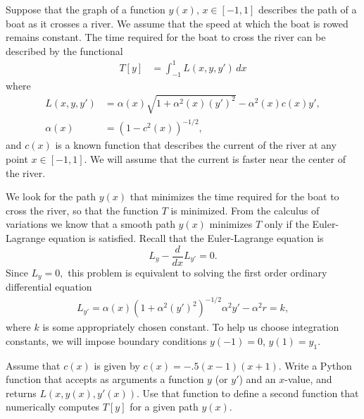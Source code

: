 \label{lab:rivercrossing}


Suppose that the graph of a function $y(x), \, x\in [-1,1]$ describes the path of a boat as it crosses a river. We assume that the speed at which the boat is rowed remains constant. The time required for the boat to cross the river can be described by the functional 
\begin{align*}
T[y] &=  \int_{-1}^1 L(x,y,y')\, dx
\end{align*}
where 
\begin{align*}
	L(x,y,y') &= \alpha(x) \sqrt{1 + \alpha^2(x)(y')^2} - \alpha^2(x)c(x)y', \\
	\alpha(x) &= (1-c^2(x))^{-1/2},
\end{align*}
and $c(x)$ is a known function that describes the current of the river at any point $x \in [-1,1]$. We will assume that the current is faster near the center of the river. 




We look for the path $y(x)$ that minimizes the time required for the boat to cross the river, so that the function $T$ is minimized. From the calculus of variations we know that a smooth path $y(x)$ minimizes $T$ only if the Euler-Lagrange equation is satisfied. Recall that the Euler-Lagrange equation is 
\[
L_{y} - \frac{d}{dx}L_{y'} = 0.
\]
Since $L_y = 0,$ this problem is equivalent to solving the first order ordinary differential equation
\begin{align*}
	L_{y'} = \alpha(x)(1 + \alpha^2 (y')^2)^{-1/2}\alpha^2 y' - \alpha^2 r =   k,
\end{align*}
where $k$ is some appropriately chosen constant. To help us choose integration constants, we will impose boundary conditions $y(-1) = 0$, $y(1) = y_1$. 



\begin{problem}
	Assume that $c(x)$ is given by $c(x) = -.5(x-1)(x+1)$.%
	Write a Python function that accepts as arguments a function $y$ (or $y'$) and an $x$-value, and returns $L(x,y(x),y'(x))$. Use that function to define a second function that numerically computes $T[y]$ for a given path $y(x)$.
\end{problem}



